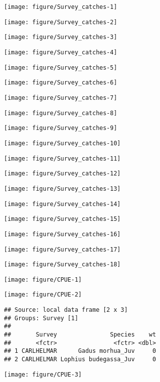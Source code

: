 \documentclass[12pt]{article}\usepackage[]{graphicx}\usepackage[]{color}
\makeatletter
\newenvironment{kframe}{%
 \def\at@end@of@kframe{}%
 \ifinner\ifhmode%
  \def\at@end@of@kframe{\end{minipage}}%
  \begin{minipage}{\columnwidth}%
 \fi\fi%
 \def\FrameCommand##1{\hskip\@totalleftmargin \hskip-\fboxsep
 \colorbox{shadecolor}{##1}\hskip-\fboxsep
     \hskip-\linewidth \hskip-\@totalleftmargin \hskip\columnwidth}%
 \MakeFramed {\advance\hsize-\width
   \@totalleftmargin\z@ \linewidth\hsize
   \@setminipage}}%
 {\par\unskip\endMakeFramed%
 \at@end@of@kframe}
\newenvironment{knitrout}{}{} %
\makeatother
\begin{document}
\begin{landscape}

\begin{knitrout}\footnotesize
{}\color{fgcolor}
\texttt{[image: figure/Survey\_catches-1]} 

\texttt{[image: figure/Survey\_catches-2]} 

\texttt{[image: figure/Survey\_catches-3]} 

\texttt{[image: figure/Survey\_catches-4]} 

\texttt{[image: figure/Survey\_catches-5]} 

\texttt{[image: figure/Survey\_catches-6]} 

\texttt{[image: figure/Survey\_catches-7]} 

\texttt{[image: figure/Survey\_catches-8]} 

\texttt{[image: figure/Survey\_catches-9]} 

\texttt{[image: figure/Survey\_catches-10]} 

\texttt{[image: figure/Survey\_catches-11]} 

\texttt{[image: figure/Survey\_catches-12]} 

\texttt{[image: figure/Survey\_catches-13]} 

\texttt{[image: figure/Survey\_catches-14]} 

\texttt{[image: figure/Survey\_catches-15]} 

\texttt{[image: figure/Survey\_catches-16]} 

\texttt{[image: figure/Survey\_catches-17]} 

\texttt{[image: figure/Survey\_catches-18]} 

\end{knitrout}

\begin{knitrout}\footnotesize
{}\color{fgcolor}
\texttt{[image: figure/CPUE-1]} 

\texttt{[image: figure/CPUE-2]} 
\begin{kframe}\begin{verbatim}
## Source: local data frame [2 x 3]
## Groups: Survey [1]
## 
##       Survey               Species    wt
##       <fctr>                <fctr> <dbl>
## 1 CARLHELMAR      Gadus morhua_Juv     0
## 2 CARLHELMAR Lophius budegassa_Juv     0
\end{verbatim}


{\ttfamily\noindent\color{warningcolor}{\#\# Warning: Removed 2 rows containing missing values (geom\_point).}}\end{kframe}
\texttt{[image: figure/CPUE-3]} 

\end{knitrout}

\end{landscape}
\end{document}
